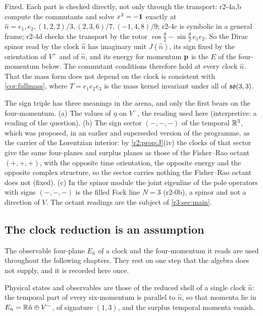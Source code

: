 Fixed. Each part is checked directly, not only through the transport: r2-4a,b compute the commutants and solve $x^2=-\mathbf 1$ exactly at
$\hat n=e_1,e_2,(1,2,2)/3,(2,3,6)/7,(-1,4,8)/9$; r2-4c is symbolic in a general frame; r2-4d checks the transport by the rotor
$\cos\frac\theta2-\sin\frac\theta2\,e_1e_2$. So the Dirac spinor read by the clock $\hat n$ has imaginary unit $J(\hat n)$, its sign fixed by the orientation of
$V^+$ and of $\hat n$, and its energy for momentum $\mathbf p$ is the $E$ of the four-momentum below. The commutant conditions therefore hold at every clock $\hat n$. That the mass form does not depend on the clock is consistent with \cref{cor:fullmass}, where
$T=e_1e_2e_3$ is the mass kernel invariant under all of $\mathfrak{so}(3,3)$.

\begin{remark}
\label{r2:rem:minus}
The sign triple has three meanings in the arena, and only the first bears on the four-momentum. (a) The values of $\eta$ on $V^-$, the reading used
here (interpretive: a reading of the question). (b) The sign sector $(-,-,-)$ of the temporal $\mathbb{R}^3$, which was proposed, in an earlier and superseded version of the programme, as the carrier of the Lorentzian interior: by
\cref{r2:prop:J}(iv) the clocks of that sector give the same four-planes and surplus planes as those of the Fisher--Rao octant $(+,+,+)$, with the
opposite time orientation, the opposite energy and the opposite complex structure, so the sector carries nothing the Fisher--Rao octant does not
(fixed). (c) In the spinor module the joint eigenline of the pole operators with signs $(-,-,-)$ is the filled Fock line $N=3$ (r2-0b), a spinor and not a
direction of $V$. The octant readings are the subject of \cref{r3:sec:main}.
\end{remark}


\subsection{The clock reduction is an assumption}
\label{sec:clockreduction}

The observable four-plane $E_{\hat n}$ of a clock and the four-momentum it reads are used throughout the following chapters. They rest on one
step that the algebra does not supply, and it is recorded here once.

\begin{assumption}
\label{assum:clockred}
Physical states and observables are those of the reduced shell of a single clock $\hat n$: the temporal part of every six-momentum is
parallel to $\hat n$, so that momenta lie in $E_{\hat n}=\mathbb{R}\hat n\oplus V^-$, of signature $(1,3)$, and the surplus temporal momenta vanish.
\end{assumption}

